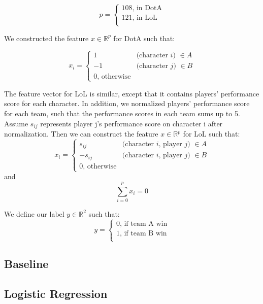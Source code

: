 \documentclass[conference]{IEEEtran}
\begin{document}
\begin{equation*}
p = 
\begin{cases}
108 \text{,    in DotA} \\
121 \text{,    in LoL} \\
\end{cases}
\end{equation*}

We constructed the feature $x \in \mathbb{R}^p$ for DotA such that:

\begin{equation*}
x_i = 
\begin{cases}
1 &  \text{(character $i$) $\in A$} \\
-1 &  \text{(character $j$) $\in B$} \\
0 \text{, otherwise}
\end{cases}
\end{equation*}

The feature vector for LoL is similar, except that it contains players' performance score for each character. In addition, we normalized players' performance score for each team, such that the performance scores in each team sums up to 5. Assume $s_{ij}$ represents player j's performance score on character i after normalization. Then we can construct the feature $x \in \mathbb{R}^p$ for LoL such that:
\begin{equation*}
x_i = 
\begin{cases}
s_{ij} &  \text{(character $i$, player $j$) $\in A$}  \\
- s_{ij} &  \text{(character $i$, player $j$) $\in B$}  \\
0 \text{, otherwise}
\end{cases}
\end{equation*}
and
\[
\sum_{i =0}^p x_i = 0
\]

We define our label $y \in \mathbb{R}^2$ such that:
\begin{equation*}
y = 
\begin{cases}
0 \text{, if team A win} \\
1 \text{, if team B win} \\
\end{cases}
\end{equation*}
\subsection{Baseline}

\subsection{Logistic Regression}
\end{document}
